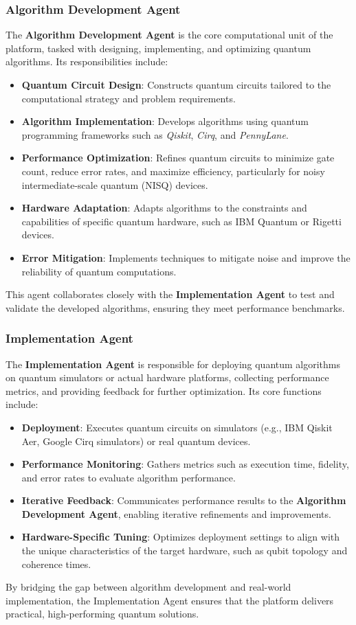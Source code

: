 \documentclass[12pt]{article}
\begin{document}
\subsubsection{Algorithm Development Agent}
The \textbf{Algorithm Development Agent} is the core computational unit of the platform, tasked with designing, implementing, and optimizing quantum algorithms. Its responsibilities include:
\begin{itemize}
    \item \textbf{Quantum Circuit Design}: Constructs quantum circuits tailored to the computational strategy and problem requirements.
    \item \textbf{Algorithm Implementation}: Develops algorithms using quantum programming frameworks such as \textit{Qiskit}, \textit{Cirq}, and \textit{PennyLane}.
    \item \textbf{Performance Optimization}: Refines quantum circuits to minimize gate count, reduce error rates, and maximize efficiency, particularly for noisy intermediate-scale quantum (NISQ) devices.
    \item \textbf{Hardware Adaptation}: Adapts algorithms to the constraints and capabilities of specific quantum hardware, such as IBM Quantum or Rigetti devices.
    \item \textbf{Error Mitigation}: Implements techniques to mitigate noise and improve the reliability of quantum computations.
\end{itemize}
This agent collaborates closely with the \textbf{Implementation Agent} to test and validate the developed algorithms, ensuring they meet performance benchmarks.

\subsubsection{Implementation Agent}
The \textbf{Implementation Agent} is responsible for deploying quantum algorithms on quantum simulators or actual hardware platforms, collecting performance metrics, and providing feedback for further optimization. Its core functions include:
\begin{itemize}
    \item \textbf{Deployment}: Executes quantum circuits on simulators (e.g., IBM Qiskit Aer, Google Cirq simulators) or real quantum devices.
    \item \textbf{Performance Monitoring}: Gathers metrics such as execution time, fidelity, and error rates to evaluate algorithm performance.
    \item \textbf{Iterative Feedback}: Communicates performance results to the \textbf{Algorithm Development Agent}, enabling iterative refinements and improvements.
    \item \textbf{Hardware-Specific Tuning}: Optimizes deployment settings to align with the unique characteristics of the target hardware, such as qubit topology and coherence times.
\end{itemize}
By bridging the gap between algorithm development and real-world implementation, the Implementation Agent ensures that the platform delivers practical, high-performing quantum solutions.
\end{document}
